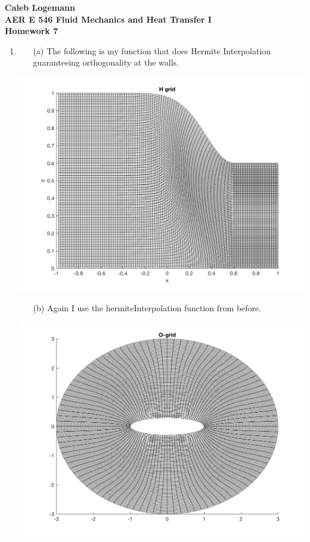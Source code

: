 \documentclass[11pt, oneside]{article}
\begin{document}
\noindent \textbf{\Large{Caleb Logemann \\
AER E 546 Fluid Mechanics and Heat Transfer I \\
Homework 7
}}

%
\begin{enumerate}
  \item %
    \begin{enumerate}
      \item[(a)]
        The following is my function that does Hermite Interpolation
        guaranteeing orthogonality at the walls.
        
    \end{enumerate}
      \begin{center}
        \includegraphics[scale=0.9]{Figures/07_01.png}
      \end{center}

    \begin{enumerate}
      \item[(b)]
        Again I use the hermiteInterpolation function from before.
    \end{enumerate}
      \begin{center}
        \includegraphics[scale=0.9]{Figures/07_02.png}
      \end{center}


\end{enumerate}
\end{document}
